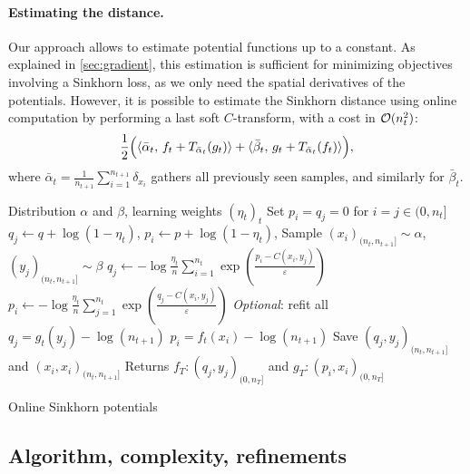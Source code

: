\paragraph{Estimating the distance.} Our approach allows to estimate
potential functions up to a constant. As explained in \autoref{sec:gradient},
this estimation is sufficient for minimizing objectives involving a Sinkhorn loss, as we
only need the spatial derivatives of the potentials. 
However, it is possible to estimate the Sinkhorn distance using online computation by performing a last soft $C$-transform, with a cost in $\Oo(n_t^2)$:
\begin{equation}
    \frac{1}{2}\Big(\dotp{\bar \alpha_t}{f_t + \Ctrans{g_t}{\bar \alpha_t}}
     + \dotp{\bar \beta_t}{g_t + \Ctrans{f_t}{\bar \alpha_t}}\Big),
\end{equation}
where $\bar \alpha_t = \frac{1}{n_{t+1}}\sum_{i=1}^{n_{t+1}} \delta_{x_i}$
gathers all previously seen samples, and similarly for $\bar \beta_t$.

\begin{algorithm}[t]
    \begin{algorithmic}
    \Input Distribution $\alpha$ and $\beta$, learning weights ${(\eta_t)}_t$
    \State Set $p_i = q_j = 0$ for $i = j \in (0, n_t]$
        \For{$i = j \in (0, n_t]$}
        \State $q_j \gets q + \log(1 - \eta_t)$, $p_i \gets p + \log(1 - \eta_t)$,
        \EndFor
        \State Sample $(x_i)_{(n_t, n_{t+1}]} \sim \alpha$, $(y_j)_{(n_t, n_{t+1}]} \sim \beta$
        \For{$i = j \in (n_t, n_{t+1}]$}
            \State $q_j \gets 
            - \log \frac{\eta_t}{n} 
            \sum_{i=1}^{n_t} \exp(\frac{p_i - C(x_i, y_j)}{\varepsilon})$
            \State $p_i \gets 
            - \log \frac{\eta_t}{n} 
            \sum_{j=1}^{n_t} \exp(\frac{q_j - C(x_i, y_j)}{\varepsilon})$
        \EndFor
        \State \textit{Optional}: refit all $q_j = g_t(y_j) - \log (n_{t+1})$
        \State\hspace{2.45cm} $p_i = f_t(x_i) - \log (n_{t+1})$
        \State Save $(q_j, y_j)_{(n_t,n_{t+1}]}$ and $(x_i, x_i)_{(n_t,n_{t+1}]}$
    \EndFor
    \State Returns $f_T : (q_j, y_j)_{(0, n_T]}$ and
    $g_T : (p_i, x_i)_{(0, n_T]}$
    \end{algorithmic}
    \caption{Online Sinkhorn potentials}\label{alg:online_sinkhorn}
\end{algorithm}


\subsection{Algorithm, complexity, refinements}

